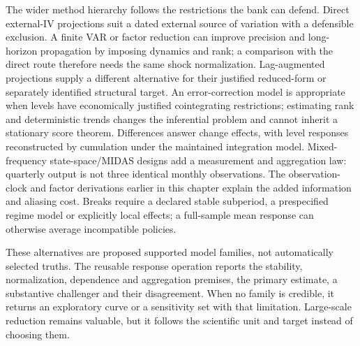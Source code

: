 The wider method hierarchy follows the restrictions the bank can defend.
Direct external-IV projections suit a dated external source of variation
with a defensible exclusion. A finite VAR or factor reduction can improve
precision and long-horizon propagation by imposing dynamics and rank; a
comparison with the direct route therefore needs the same shock normalization.
Lag-augmented projections supply a different alternative for their justified
reduced-form or separately identified structural target. An error-correction model is appropriate when levels have
economically justified cointegrating restrictions; estimating rank and
deterministic trends changes the inferential problem and cannot inherit a
stationary score theorem. Differences answer change effects, with level
responses reconstructed by cumulation under the maintained integration
model. Mixed-frequency state-space/MIDAS designs add a measurement and
aggregation law: quarterly output is not three identical monthly observations.
The observation-clock and factor derivations earlier in this chapter explain
the added information and aliasing cost. Breaks require a declared stable
subperiod, a prespecified regime model or explicitly local effects; a
full-sample mean response can otherwise average incompatible policies.

These alternatives are proposed supported model families, not automatically
selected truths. The reusable response operation reports the stability,
normalization, dependence and aggregation premises, the primary estimate,
a substantive challenger and their disagreement. When no family is credible,
it returns an exploratory curve or a sensitivity set with that limitation.
Large-scale reduction remains valuable, but it follows the scientific unit
and target instead of choosing them.
